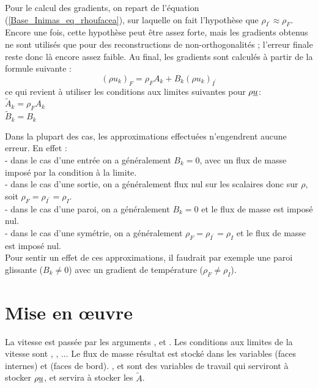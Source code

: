 Pour le calcul des gradients, on repart de l'\'equation (\ref{Base_Inimas_eq_rhoufacea}), sur
laquelle on fait l'hypoth\`ese que $\rho_{I^\prime}\approx\rho_F$. Encore une
fois, cette hypoth\`ese peut \^etre assez forte, mais les gradients obtenus ne
sont utilis\'es que pour des reconstructions de non-orthogonalit\'es ; l'erreur
finale reste donc l\`a encore assez faible.
Au final, les gradients sont calcul\'es \`a partir de la formule suivante :
\begin{equation}
(\rho u_k)_F = \rho_F A_k + B_k(\rho u_k)_{I^\prime}
\end{equation}
ce qui revient \`a utiliser les conditions aux limites suivantes pour
$\rho \underline{u}$:\\
$\tilde{A}_k = \rho_F A_k$\\
$\tilde{B}_k = B_k$


Dans la plupart des cas, les approximations effectu\'ees n'engendrent aucune
erreur. En effet :\\
- dans le cas d'une entr\'ee on a g\'en\'eralement $B_k=0$, avec un flux de
masse imposé par la condition à la limite.\\
- dans le cas d'une sortie, on a g\'en\'eralement flux nul sur les scalaires
donc sur $\rho$, soit \mbox{$\rho_F=\rho_{I^\prime}=\rho_I$}.\\
- dans le cas d'une paroi, on a g\'en\'eralement $B_k=0$ et le flux de masse
est imposé nul.\\
- dans le cas d'une sym\'etrie, on a g\'en\'eralement
$\rho_F=\rho_{I^\prime}=\rho_I$ et le flux de masse est imposé nul.\\
Pour sentir un effet de ces approximations, il faudrait par exemple une paroi
glissante ($B_k\ne0$) avec un gradient de temp\'erature ($\rho_F\ne\rho_I$).

\section*{Mise en \oe uvre}

La vitesse est pass\'ee par les arguments ,  et . Les
conditions aux limites de la vitesse sont , , ... Le
flux de masse r\'esultat est stock\'e dans les variables  (faces
internes) et  (faces de bord). ,  et 
sont des variables de travail qui serviront \`a stocker $\rho\underline{u}$, et
 servira \`a stocker les $\tilde{A}$.

